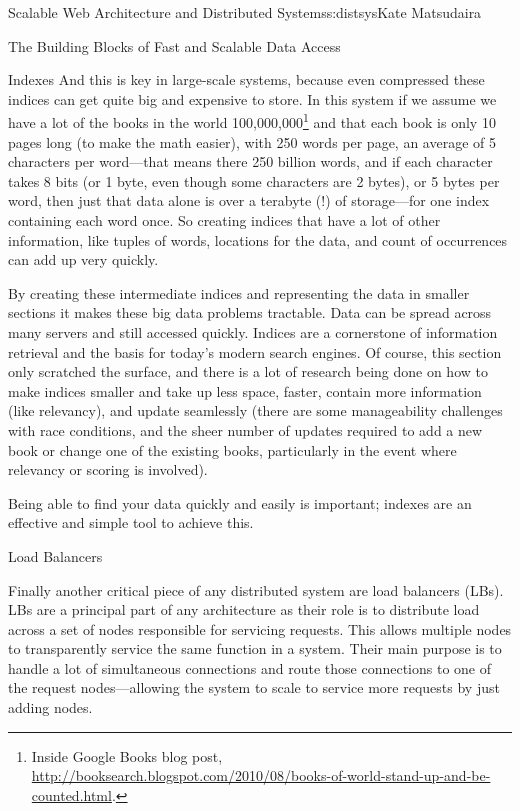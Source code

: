 \begin{aosachapter}{Scalable Web Architecture and Distributed Systems}{s:distsys}{Kate Matsudaira}
\begin{aosasect1}{The Building Blocks of Fast and Scalable Data Access}
\begin{aosasect2}{Indexes}
And this is key in large-scale systems, because even compressed these
indices can get quite big and expensive to store. In this system if we
assume we have a lot of the books in the world
100,000,000\footnote{Inside Google Books blog post,
  \url{http://booksearch.blogspot.com/2010/08/books-of-world-stand-up-and-be-counted.html}.}
and that each book is only 10 pages long (to make the math easier),
with 250 words per page, an average of 5 characters per word---that
means there 250 billion words, and if each character takes 8 bits (or
1 byte, even though some characters are 2 bytes), or 5 bytes per word,
then just that data alone is over a terabyte (!) of storage---for one
index containing each word once. So creating indices that have a lot
of other information, like tuples of words, locations for the data,
and count of occurrences can add up very quickly.

By creating these intermediate indices and representing the data in
smaller sections it makes these big data problems tractable. Data can
be spread across many servers and still accessed quickly. Indices are
a cornerstone of information retrieval and the basis for today’s
modern search engines. Of course, this section only scratched the
surface, and there is a lot of research being done on how to make
indices smaller and take up less space, faster, contain more
information (like relevancy), and update seamlessly (there are some
manageability challenges with race conditions, and the sheer number of
updates required to add a new book or change one of the existing
books, particularly in the event where relevancy or scoring is
involved).

Being able to find your data quickly and easily is important; indexes
are an effective and simple tool to achieve this.

\end{aosasect2}

\begin{aosasect2}{Load Balancers}

Finally another critical piece of any distributed system are load
balancers (LBs). LBs are a principal part of any architecture as their
role is to distribute load across a set of nodes responsible for
servicing requests. This allows multiple nodes to transparently
service the same function in a system. Their main purpose is to handle
a lot of simultaneous connections and route those connections to one
of the request nodes---allowing the system to scale to service more
requests by just adding nodes.


\end{aosasect2}
\end{aosasect1}
\end{aosachapter}
